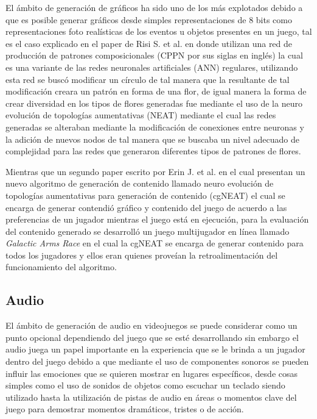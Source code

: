 El ámbito de generación de gráficos ha sido uno de los más explotados debido a
que es posible generar gráficos desde simples representaciones de 8 bits como
representaciones foto realísticas de los eventos u objetos presentes en un
juego, tal es el caso explicado en el paper de Risi S. et al.\cite{Risi2012} en
donde utilizan una red de producción de patrones composicionales (CPPN por sus
siglas en inglés) la cual es una variante de las redes neuronales artificiales
(ANN) regulares, utilizando esta red se buscó modificar un círculo de tal manera
que la resultante de tal modificación creara un patrón en forma de una flor, de
igual manera la forma de crear diversidad en los tipos de flores generadas fue
mediante el uso de la neuro evolución de topologías aumentativas (NEAT) mediante
el cual las redes generadas se alteraban mediante la modificación de conexiones
entre neuronas y la adición de nuevos nodos de tal manera que se buscaba un
nivel adecuado de complejidad para las redes que generaron diferentes tipos de
patrones de flores.

Mientras que un segundo paper escrito por Erin J. et al.\cite{Hastings2009} en
el cual presentan un nuevo algoritmo de generación de contenido llamado
neuro evolución de topologías aumentativas para generación de contenido (cgNEAT)
el cual se encarga de generar contendió gráfico y contenido del juego de acuerdo
a las preferencias de un jugador mientras el juego está en ejecución, para la
evaluación del contenido generado se desarrolló un juego multijugador en línea
llamado \textit{Galactic Arms Race} en el cual la cgNEAT se encarga de generar
contenido para todos los jugadores y ellos eran quienes proveían la
retroalimentación del funcionamiento del algoritmo.

\subsection{Audio}
\label{subsection:Audio}

El ámbito de generación de audio en videojuegos se puede considerar como un
punto opcional dependiendo del juego que se esté desarrollando sin embargo el
audio juega un papel importante en la experiencia que se le brinda a un jugador
dentro del juego debido a que mediante el uso de componentes sonoros se pueden
influir las emociones que se quieren mostrar en lugares específicos, desde cosas
simples como el uso de sonidos de objetos como escuchar un teclado siendo
utilizado hasta la utilización de pistas de audio en áreas o momentos clave del
juego para demostrar momentos dramáticos, tristes o de acción. 

